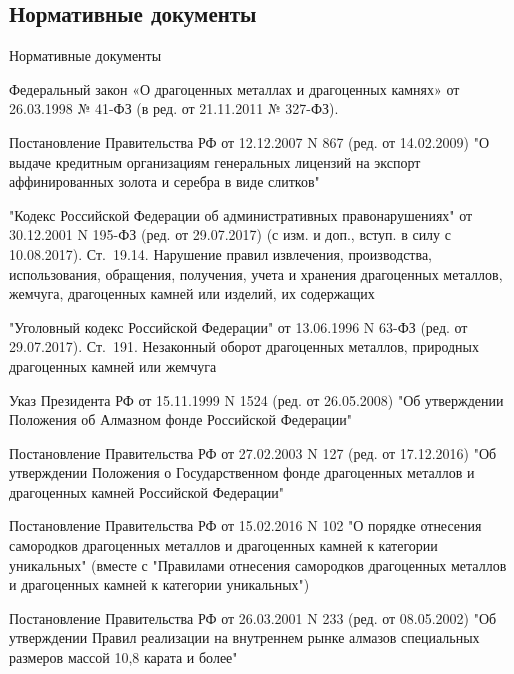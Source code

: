 \documentclass[_Banking_p3.tex]{subfiles}
\begin{document}

\subsection{Нормативные документы}
\begin{frame}[allowframebreaks]{Нормативные документы}
  \begin{thebibliography}{10}
  
  \beamertemplatearticlebibitems

Федеральный закон «О драгоценных металлах и драгоценных камнях» от 26.03.1998 № 41-ФЗ (в ред. от 21.11.2011 № 327-ФЗ).

Постановление Правительства РФ от 12.12.2007 N 867 (ред. от 14.02.2009) "О выдаче кредитным организациям генеральных лицензий на экспорт аффинированных золота и серебра в виде слитков"


\pagebreak

"Кодекс Российской Федерации об административных правонарушениях" от 30.12.2001 N 195-ФЗ (ред. от 29.07.2017) (с изм. и доп., вступ. в силу с 10.08.2017). Ст.~19.14. Нарушение правил извлечения, производства, использования, обращения, получения, учета и хранения драгоценных металлов, жемчуга, драгоценных камней или изделий, их содержащих



"Уголовный кодекс Российской Федерации" от 13.06.1996 N 63-ФЗ (ред. от 29.07.2017). Ст.~191. Незаконный оборот драгоценных металлов, природных драгоценных камней или жемчуга

\pagebreak

Указ Президента РФ от 15.11.1999 N 1524 (ред. от 26.05.2008) "Об утверждении Положения об Алмазном фонде Российской Федерации"


Постановление Правительства РФ от 27.02.2003 N 127 (ред. от 17.12.2016) "Об утверждении Положения о Государственном фонде драгоценных металлов и драгоценных камней Российской Федерации"

\pagebreak

Постановление Правительства РФ от 15.02.2016 N 102 "О порядке отнесения самородков драгоценных металлов и драгоценных камней к категории уникальных" (вместе с "Правилами отнесения самородков драгоценных металлов и драгоценных камней к категории уникальных")

\pagebreak
Постановление Правительства РФ от 26.03.2001 N 233 (ред. от 08.05.2002) "Об утверждении Правил реализации на внутреннем рынке алмазов специальных размеров массой 10,8 карата и более"

  \end{thebibliography}
\end{frame}
\end{document}

